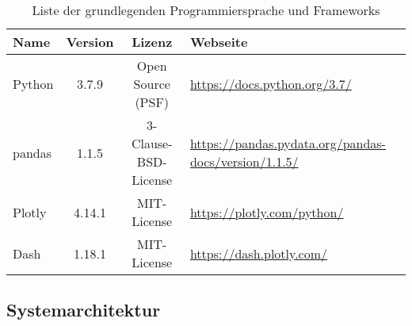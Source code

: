     \begingroup
        \setlength{\tabcolsep}{4pt} %
        \renewcommand{\arraystretch}{1.5}
        \begin{table}[h]
            \centering
            \begin{adjustbox}{max width=\textwidth}
            \Huge
            \begin{tabular}{lccl}
               \toprule
               \textbf{Name}             &{Version}    &\textbf{Lizenz}                        & \textbf{Webseite}\\
               \midrule     
                    Python               &3.7.9         &Open Source (PSF)                     & \url{https://docs.python.org/3.7/}\\
                    pandas               &1.1.5         &3-Clause-BSD-License                  & \url{https://pandas.pydata.org/pandas-docs/version/1.1.5/}\\
                    Plotly               &4.14.1       &MIT-License                           & \url{https://plotly.com/python/}\\
                    Dash                 &1.18.1        &MIT-License                           & \url{https://dash.plotly.com/}\\


                \bottomrule
            \end{tabular}
            \end{adjustbox}
            \caption{%
                Liste der grundlegenden Programmiersprache und Frameworks
            \label{tab:Software-Requirements}
            }
             \end{table}
        \endgroup
    
     
    \subsection{Systemarchitektur}
    
